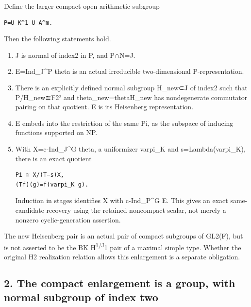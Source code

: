 Define the larger compact open arithmetic subgroup

\begin{Verbatim}[fontsize=\small,breaklines=true,breakanywhere=true]
P=U_K^1 U_A^m.
\end{Verbatim}

Then the following statements hold.

\begin{enumerate}
\def\labelenumi{\arabic{enumi}.}
\item
  J is normal of index2 in P, and P∩N=J.
\item
  E=Ind\_J\^{}P theta is an actual irreducible two-dimensional
  P-representation.
\item
  There is an explicitly defined normal subgroup H\_new⊂J of index2 such
  that P/H\_new≅F2² and theta\_new=theta\textbar H\_new has
  nondegenerate commutator pairing on that quotient. E is its Heisenberg
  representation.
\item
  E embeds into the restriction of the same Pi, as the subspace of
  inducing functions supported on NP.
\item
  With X=c-Ind\_J\^{}G theta, a uniformizer varpi\_K and
  s=Lambda(varpi\_K), there is an exact quotient

\begin{Verbatim}[fontsize=\small,breaklines=true,breakanywhere=true]
Pi ≅ X/(T−s)X,
(Tf)(g)=f(varpi_K g).
\end{Verbatim}

  Induction in stages identifies X with c-Ind\_P\^{}G E. This gives an
  exact same-candidate recovery using the retained noncompact scalar,
  not merely a nonzero cyclic-generation assertion.
\end{enumerate}

The new Heisenberg pair is an actual pair of compact subgroups of
GL2(F), but is not asserted to be the BK H\textsuperscript{1/J}1 pair of
a maximal simple type. Whether the original H2 realization relation
allows this enlargement is a separate obligation.

\hypertarget{rank2-the-compact-enlargement-is-a-group-with-normal-subgroup-of-index-two}{%
\subsection{2. The compact enlargement is a group, with normal subgroup
of index
two}\label{rank2-the-compact-enlargement-is-a-group-with-normal-subgroup-of-index-two}}

